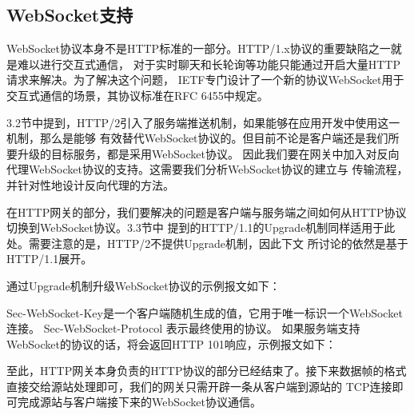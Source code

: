 \documentclass[twoside]{CUGThesis}
\begin{document}
	\subsection{WebSocket支持}
	WebSocket协议本身不是HTTP标准的一部分。HTTP/1.x协议的重要缺陷之一就是难以进行交互式通信，
	对于实时聊天和长轮询等功能只能通过开启大量HTTP请求来解决。为了解决这个问题，
	IETF专门设计了一个新的协议WebSocket用于交互式通信的场景，其协议标准在RFC 6455中规定\cite{fette2011websocket}。\par
	3.2节中提到，HTTP/2引入了服务端推送机制，如果能够在应用开发中使用这一机制，那么是能够
	有效替代WebSocket协议的。但目前不论是客户端还是我们所要升级的目标服务，都是采用WebSocket协议。
	因此我们要在网关中加入对反向代理WebSocket协议的支持。这需要我们分析WebSocket协议的建立与
	传输流程，并针对性地设计反向代理的方法。\par
	在HTTP网关的部分，我们要解决的问题是客户端与服务端之间如何从HTTP协议切换到WebSocket协议。3.3节中
	提到的HTTP/1.1的Upgrade机制同样适用于此处。需要注意的是，HTTP/2不提供Upgrade机制，因此下文
	所讨论的依然是基于HTTP/1.1展开。\par
	通过Upgrade机制升级WebSocket协议的示例报文如下：\\ 
	 \par
	Sec-WebSocket-Key是一个客户端随机生成的值，它用于唯一标识一个WebSocket连接。
    Sec-WebSocket-Protocol 表示最终使用的协议。	
	如果服务端支持WebSocket的协议的话，将会返回HTTP 101响应，示例报文如下：\\
	 \par
	至此，HTTP网关本身负责的HTTP协议的部分已经结束了。接下来数据帧的格式直接交给源站处理即可，我们的网关只需开辟一条从客户端到源站的
	TCP连接即可完成源站与客户端接下来的WebSocket协议通信。
\end{document}
